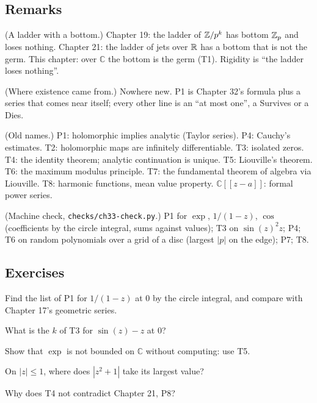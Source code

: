 \subsection*{Remarks}

\begin{lines}
\item[\lab{R1}] (A ladder with a bottom.) Chapter 19: the ladder of $\mathbb{Z}/p^k$ has bottom $\mathbb{Z}_p$ and loses nothing. Chapter 21: the ladder of jets over $\mathbb{R}$ has a bottom that is not the germ. This chapter: over $\mathbb{C}$ the bottom is the germ (T1). Rigidity is ``the ladder loses nothing''.
\item[\lab{R2}] (Where existence came from.) Nowhere new. P1 is Chapter 32's formula plus a series that comes near itself; every other line is an ``at most one'', a Survives or a Dies.
\item[\lab{R3}] (Old names.) P1: holomorphic implies analytic (Taylor series). P4: Cauchy's estimates. T2: holomorphic maps are infinitely differentiable. T3: isolated zeros. T4: the identity theorem; analytic continuation is unique. T5: Liouville's theorem. T6: the maximum modulus principle. T7: the fundamental theorem of algebra via Liouville. T8: harmonic functions, mean value property. $\mathbb{C}[[z - a]]$: formal power series.
\item[\lab{R4}] (Machine check, \texttt{checks/ch33-check.py}.) P1 for $\exp$, $1/(1 - z)$, $\cos$ (coefficients by the circle integral, sums against values); T3 on $\sin(z)^2 z$; P4; T6 on random polynomials over a grid of a disc (largest $|p|$ on the edge); P7; T8.
\end{lines}

\subsection*{Exercises}

\begin{lines}
\item[\lab{E1}] Find the list of P1 for $1/(1 - z)$ at $0$ by the circle integral, and compare with Chapter 17's geometric series.
\item[\lab{E2}] What is the $k$ of T3 for $\sin(z) - z$ at $0$?
\item[\lab{E3}] Show that $\exp$ is not bounded on $\mathbb{C}$ without computing: use T5.
\item[\lab{E4}] On $|z| \le 1$, where does $|z^2 + 1|$ take its largest value?
\item[\lab{E5}] Why does T4 not contradict Chapter 21, P8?
\end{lines}
\newpage

